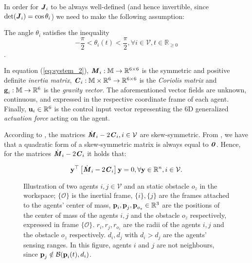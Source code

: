 In order for $\bm{\mathit{J}}_i$ to be always well-defined (and hence invertible, since
$\det(\bm{\mathit{J}}_i) = \cos\theta_i$) we need to make the following assumption:

\begin{assumption} \label{as:J}
	The angle $\theta_i$ satisfies the inequality
  $$-\frac{\pi}{2} < \theta_i(t) < \frac{\pi}{2} ,\forall i\in\mathcal{V},t\in\mathbb{R}_{\geq 0}$$.
\end{assumption}

In equation (\ref{eq:system_2}), $\bm{\mathit{M}}_i:\mathbb{M} \to \mathbb{R}^{6\times6}$ is
the symmetric and positive definite \textit{inertia matrix},
$\bm{\mathit{C}}_i:\mathbb{M}\times\mathbb{R}^6 \to \mathbb{R}^{6\times6}$ is the
\textit{Coriolis matrix} and $\bm{\mathbf{g}}_i:\mathbb{M} \to \mathbb{R}^6$ is the
\textit{gravity vector}. The aforementioned vector fields are unknown, continuous,
and expressed in the respective coordinate frame of each agent.
Finally, $\bm{\mathbf{u}}_i\in\mathbb{R}^6$ is the control input vector representing the $6$D
generalized \textit{actuation force} acting on the agent.


\begin{remark}
	According to \cite{Siciliano2009}, the matrices
  $\dot{\bm{\mathit{M}}}_i - 2\bm{\mathit{C}}_i, i \in \mathcal{V}$ are skew-symmetric.
  From \cite{horn_jonshon}, we have that a quadratic form of a skew-symmetric
  matrix is always equal to $\bm{\mathit{0}}$. Hence, for the matrices
  $\dot{\bm{\mathit{M}}}_i - 2 \bm{\mathit{C}}_i$ it holds that:

	\begin{equation} \label{eq:skew_symm}
	  \bm{\mathbf{y}}^\top \left[\dot{\bm{\mathit{M}}}_i - 2 \bm{\mathit{C}}_i\right]\bm{\mathbf{y}} = 0,
      \forall \bm{\mathbf{y}} \in \mathbb{R}^n, i \in \mathcal{V}.
	\end{equation}

\end{remark}

\begin{figure}[ht!]
	\centering
    
    \caption{Illustration of two agents $i, j \in \mathcal{V}$ and an static
      obstacle $o_z$ in the workspace; $\{\mathcal{O}\}$ is the inertial frame,
      $\{i\}, \{j\}$ are the frames attached to the agents' center of mass,
      $\bm{\mathbf{p}}_i, \bm{\mathbf{p}}_j, \bm{\mathbf{p}}_{o_z} \in \mathbb{R}^3$ are the
      positions of the center of mass of the agents $i,j$ and the
      obstacle $o_z$ respectively, expressed in frame
      $\{\mathcal{O}\}$. $r_i, r_j, r_{o_z}$ are the radii of the agents $i,j$
      and the obstacle $o_z$ respectively. $d_i, d_j$ with
      $d_i > d_j$ are the agents' sensing ranges.
      In this figure, agents $i$ and $j$ are not neighbours, since
      $\bm{\mathbf{p}}_j \notin \mathcal{B}(\bm{\mathbf{p}}_i(t), d_i)$.}
	\label{fig:two_agents_one_obstacle}
\end{figure}

